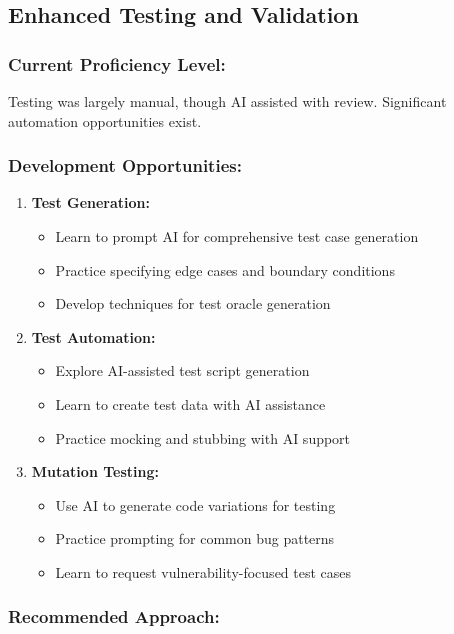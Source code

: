 \documentclass[12pt,a4paper]{article}
\begin{document}
\subsection{Enhanced Testing and Validation}

\subsubsection*{Current Proficiency Level:}
Testing was largely manual, though AI assisted with review. Significant automation opportunities exist.

\subsubsection*{Development Opportunities:}

\begin{enumerate}
    \item \textbf{Test Generation:}
    \begin{itemize}
        \item Learn to prompt AI for comprehensive test case generation
        \item Practice specifying edge cases and boundary conditions
        \item Develop techniques for test oracle generation
    \end{itemize}
    
    \item \textbf{Test Automation:}
    \begin{itemize}
        \item Explore AI-assisted test script generation
        \item Learn to create test data with AI assistance
        \item Practice mocking and stubbing with AI support
    \end{itemize}
    
    \item \textbf{Mutation Testing:}
    \begin{itemize}
        \item Use AI to generate code variations for testing
        \item Practice prompting for common bug patterns
        \item Learn to request vulnerability-focused test cases
    \end{itemize}
\end{enumerate}

\subsubsection*{Recommended Approach:}
\end{document}
